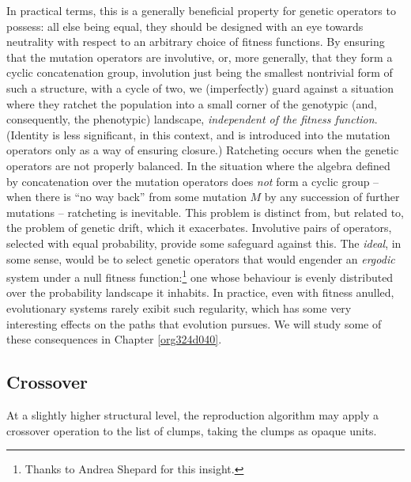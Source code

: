 \documentclass[12pt,glossary]{dalthesis}
\begin{document}
In practical terms, this is a generally beneficial property for genetic
operators to possess: all else being equal, they should be designed with
an eye towards neutrality with respect to an arbitrary choice of fitness
functions. By ensuring that the mutation operators are involutive, or, more
generally, that they form a cyclic concatenation group, involution just being
the smallest nontrivial form of such a structure, with a cycle of two, we
(imperfectly) guard against a situation where they ratchet the population into a
small corner of the genotypic (and, consequently, the phenotypic) landscape,
\emph{independent of the fitness function}. (Identity is less significant, in this
context, and is introduced into the mutation operators only
as a way of ensuring closure.) Ratcheting occurs when the genetic
operators are not properly balanced. In the situation where the algebra defined
by concatenation over the mutation operators does \emph{not} form a cyclic group --
when there is ``no way back'' from some mutation \(M\) by any succession of further
mutations -- ratcheting is inevitable. This problem is distinct from, but
related to, the problem of genetic drift, which it exacerbates. Involutive pairs
of operators, selected with equal probability, provide some safeguard against
this. The \emph{ideal}, in some sense, would be to select genetic operators that
would engender an \emph{ergodic} system under a null fitness function:\footnote{Thanks to
Andrea Shepard for this insight.} one whose behaviour is evenly distributed
over the probability landscape it inhabits. In practice, even with fitness
anulled, evolutionary systems rarely exibit such regularity, which has some very
interesting effects on the paths that evolution pursues. We will study some of
these consequences in Chapter \ref{org324d040}.


\subsection{Crossover}
\label{sec:org1b5eb49}
\label{org177d9df} 

At a slightly higher structural level, the reproduction
algorithm may apply a crossover operation to the list of clumps, taking the
clumps as opaque units.
\end{document}
